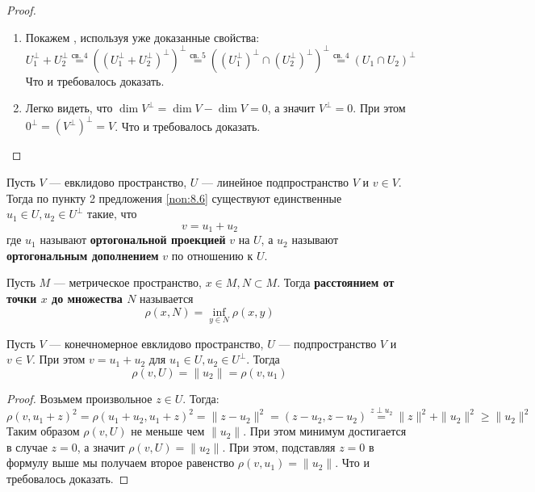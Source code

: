 \documentclass[../main.tex]{subfiles}
\begin{document}
\begin{proof}
\begin{enumerate}
    \item Покажем , используя уже доказанные свойства:
    \begin{equation*}
      U_1^\perp + U_2^\perp
      \overset{\text{св. 4}}{=}
      ((U_1^\perp + U_2^\perp)^\perp)^\perp
      \overset{\text{св. 5}}{=}
      ((U_1^\perp)^\perp \cap (U_2^\perp)^\perp)^\perp
      \overset{\text{св. 4}}{=}
      (U_1 \cap U_2)^\perp
    \end{equation*}
    Что и требовалось доказать.

    \item Легко видеть, что $\dim V^\perp = \dim V - \dim V = 0$, а значит $V^\perp = 0$. При этом $0^\perp = (V^\perp)^\perp = V$. Что и требовалось доказать.
  \end{enumerate}
\end{proof}

\begin{definition}
  Пусть $V$ --- евклидово пространство, $U$ --- линейное подпространство $V$ и $v \in V$. Тогда по пункту 2 предложения \ref{non:8.6} существуют единственные $u_1 \in U, u_2 \in U^\perp$ такие, что
  \begin{equation*}
    v = u_1 + u_2
  \end{equation*}
  где $u_1$ называют \textbf{ортогональной проекцией} $v$ на $U$, а $u_2$ называют \textbf{ортогональным дополнением} $v$ по отношению к $U$.
\end{definition}

\begin{definition}
  Пусть $M$ --- метрическое пространство, $x \in M, N \subset M$. Тогда \textbf{расстоянием от точки $x$ до множества $N$} называется
  \begin{equation*}
    \rho(x, N) = \inf\limits_{y \in N} \rho(x, y)
  \end{equation*}
\end{definition}

\begin{theorem-non}
  Пусть $V$ --- конечномерное евклидово пространство, $U$ --- подпространство $V$ и $v \in V$. При этом $v = u_1 + u_2$ для $u_1 \in U, u_2 \in U^\perp$. Тогда
  \begin{equation*}
    \rho(v, U) = \| u_2 \| = \rho(v, u_1)
  \end{equation*}
\end{theorem-non}
\begin{proof}
  Возьмем произвольное $z \in U$. Тогда:
  \begin{equation*}
    \rho(v, u_1 + z)^2 = \rho(u_1 + u_2, u_1 + z)^2 = \| z - u_2 \|^2 = (z - u_2, z - u_2) \overset{z \perp u_2}{=} \| z \|^2 + \| u_2 \|^2 \geq \| u_2 \|^2
  \end{equation*}
  Таким образом $\rho(v, U)$ не меньше чем $\| u_2 \|$. При этом минимум достигается в случае $z = 0$, а значит $\rho(v, U) = \| u_2 \|$. При этом, подставляя $z = 0$ в формулу выше мы получаем второе равенство $\rho(v, u_1) = \| u_2 \|$. Что и требовалось доказать.
\end{proof}
\end{document}

